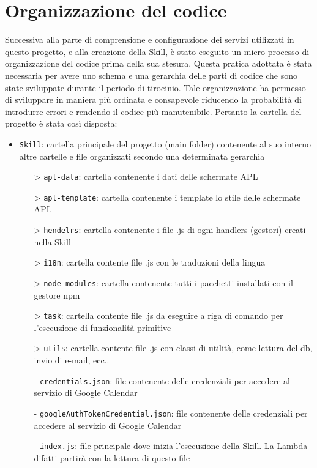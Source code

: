 \section{Organizzazione del codice}
Successiva alla parte di comprensione e configurazione dei servizi utilizzati in questo progetto, e alla creazione della Skill, è stato eseguito un micro-processo di organizzazione del codice prima della sua stesura. Questa pratica adottata è stata necessaria per avere uno schema e una gerarchia delle parti di codice che sono state sviluppate durante il periodo di tirocinio. Tale organizzazione ha permesso di sviluppare in maniera più ordinata e consapevole riducendo la probabilità di introdurre errori e rendendo il codice più manutenibile. Pertanto la cartella del progetto è stata così disposta:
\begin{itemize}
        \item \texttt{Skill}: cartella principale del progetto (main folder) contenente al suo interno altre cartelle e file organizzati secondo una determinata gerarchia
        \begin{itemize}
            \item[>] \texttt{apl-data}: cartella contenente i dati delle schermate APL
            \item[>] \texttt{apl-template}: cartella contenente i template lo stile delle schermate APL
            \item[>] \texttt{hendelrs}: cartella contenente i file .js di ogni handlers (gestori) creati nella Skill
            \item[>] \texttt{i18n}: cartella contente file .js con le traduzioni della lingua 
            \item[>] \texttt{node\_modules}: cartella contenente tutti i pacchetti installati con il gestore npm
            \item[>] \texttt{task}: cartella contente file .js da eseguire a riga di comando per l'esecuzione di funzionalità primitive 
            \item[>] \texttt{utils}: cartella contente file .js con classi di utilità, come lettura del db, invio di e-mail, ecc..
            \item[-] \texttt{credentials.json}: file contenente delle credenziali per accedere al servizio di Google Calendar
            \item[-] \texttt{googleAuthTokenCredential.json}: file contenente delle credenziali per accedere al servizio di Google Calendar
            \item[-] \texttt{index.js}: file principale dove inizia l'esecuzione della Skill. La Lambda difatti partirà con la lettura di questo file

\end{itemize}
\end{itemize}

